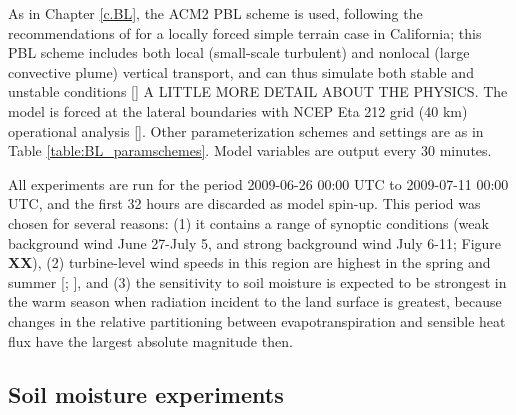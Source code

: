 As in Chapter \ref{c.BL}, the ACM2 PBL scheme is used, following the recommendations of \cite{marjanovic2014} for a locally forced simple terrain case in California; this PBL scheme includes both local (small-scale turbulent) and nonlocal (large convective plume) vertical transport, and can thus simulate both stable and unstable conditions [\cite{pleim2007combined}] A LITTLE MORE DETAIL ABOUT THE PHYSICS.  The model is forced at the lateral boundaries with NCEP Eta 212 grid (40 km) operational analysis [\cite{ncep}].  Other parameterization schemes and settings are as in Table \ref{table:BL_paramschemes}.  Model variables are output every 30 minutes.

All experiments are run for the period 2009-06-26 00:00 UTC to 2009-07-11 00:00 UTC, and the first 32 hours are discarded as model spin-up.  This period was chosen for several reasons: (1) it contains a range of synoptic conditions (weak background wind June 27-July 5, and strong background wind July 6-11; Figure \textbf{XX}), (2) turbine-level wind speeds in this region are highest in the spring and summer [\cite{zhong2004diurnal}; \cite{mansbach2010synoptic}], and (3) the sensitivity to soil moisture is expected to be strongest in the warm season when radiation incident to the land surface is greatest, because changes in the relative partitioning between evapotranspiration and sensible heat flux have the largest absolute magnitude then.

\subsection{Soil moisture experiments}

